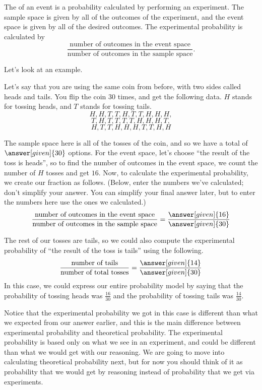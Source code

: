 \documentclass{ximera}
\begin{document}
\begin{definition}
The  of an event is a probability calculated by performing an experiment. The sample space is given by all of the outcomes of the experiment, and the event space is given by all of the desired outcomes. The experimental probability is calculated by 
\[
\frac{\textrm{number of outcomes in the event space}}{\textrm{number of outcomes in the sample space}}.
\]
\end{definition}
Let's look at an example.
\begin{example}
Let's say that you are using the same coin from before, with two sides called heads and tails. You flip the coin $30$ times, and get the following data. $H$ stands for tossing heads, and $T$ stands for tossing tails.
\[
H, H, T, T, H, T, T, H, H, H,
\]
\[
T, H, T, T, T, T, H, H, H, T,
\]
\[
H, T, T, H, H, H, T, T, H, H
\]

The sample space here is all of the tosses of the coin, and so we have a total of $\answer[given]{30}$ options. For the event space, let's choose ``the result of the toss is heads'', so to find the number of outcomes in the event space, we count the number of $H$ tosses and get $16$. Now, to calculate the experimental probability, we create our fraction as follows. (Below, enter the numbers we've calculated; don't simplify your answer. You can simplify your final answer later, but to enter the numbers here use the ones we calculated.)
\[
\frac{\textrm{number of outcomes in the event space}}{\textrm{number of outcomes in the sample space}} = \frac{\answer[given]{16}}{\answer[given]{30}}
\]

The rest of our tosses are tails, so we could also compute the experimental probability of ``the result of the toss is tails'' using the following.
\[
\frac{\textrm{number of tails}}{\textrm{number of total tosses}} = \frac{\answer[given]{14}}{\answer[given]{30}}
\]
In this case, we could express our entire probability model by saying that the probability of tossing heads was $\frac{16}{30}$ and the probability of tossing tails was $\frac{14}{30}$.
\end{example}

Notice that the experimental probability we got in this case is different than what we expected from our answer earlier, and this is the main difference between experimental probability and theoretical probability. The experimental probability is based only on what we see in an experiment, and could be different than what we would get with our reasoning. We are going to move into calculating theoretical probability next, but for now you should think of it as probability that we would get by reasoning instead of probability that we get via experiments.
\end{document}
